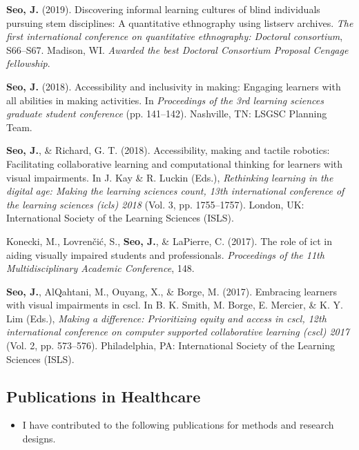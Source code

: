 \documentclass[11pt, a4paper]{awesome-cv}
\providecommand{\tightlist}{%
	\setlength{\itemsep}{0pt}\setlength{\parskip}{0pt}}
\begin{document}
\leavevmode\hypertarget{ref-seo2019discovering}{}%
\textbf{Seo, J.} (2019). Discovering informal learning cultures of blind
individuals pursuing stem disciplines: A quantitative ethnography using
listserv archives. \emph{The first international conference on
quantitative ethnography: Doctoral consortium}, S66--S67. Madison, WI.
\emph{Awarded the best Doctoral Consortium Proposal Cengage fellowship}.

\leavevmode\hypertarget{ref-seo2018making}{}%
\textbf{Seo, J.} (2018). Accessibility and inclusivity in making:
Engaging learners with all abilities in making activities. In
\emph{Proceedings of the 3rd learning sciences graduate student
conference} (pp. 141--142). Nashville, TN: LSGSC Planning Team.

\leavevmode\hypertarget{ref-seo2018accessibility}{}%
\textbf{Seo, J.}, \& Richard, G. T. (2018). Accessibility, making and
tactile robotics: Facilitating collaborative learning and computational
thinking for learners with visual impairments. In J. Kay \& R. Luckin
(Eds.), \emph{Rethinking learning in the digital age: Making the
learning sciences count, 13th international conference of the learning
sciences (icls) 2018} (Vol. 3, pp. 1755--1757). London, UK:
International Society of the Learning Sciences (ISLS).

\leavevmode\hypertarget{ref-konecki2017role}{}%
Konecki, M., Lovrenčić, S., \textbf{Seo, J.}, \& LaPierre, C. (2017).
The role of ict in aiding visually impaired students and professionals.
\emph{Proceedings of the 11th Multidisciplinary Academic Conference},
148.

\leavevmode\hypertarget{ref-seo2017embracing}{}%
\textbf{Seo, J.}, AlQahtani, M., Ouyang, X., \& Borge, M. (2017).
Embracing learners with visual impairments in cscl. In B. K. Smith, M.
Borge, E. Mercier, \& K. Y. Lim (Eds.), \emph{Making a difference:
Prioritizing equity and access in cscl, 12th international conference on
computer supported collaborative learning (cscl) 2017} (Vol. 2, pp.
573--576). Philadelphia, PA: International Society of the Learning
Sciences (ISLS).

\hypertarget{publications-in-healthcare}{%
\subsection{Publications in
Healthcare}\label{publications-in-healthcare}}

\begin{itemize}
\tightlist
\item
  I have contributed to the following publications for methods and
  research designs.
\end{itemize}
\end{document}
